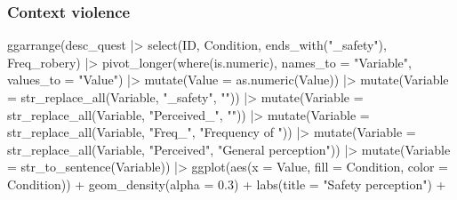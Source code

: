 \documentclass[
  bookmarksnumbered]{article}
\newenvironment{Shaded}{\begin{snugshade}}{\end{snugshade}}
\newcommand{\AttributeTok}[1]{\textcolor[rgb]{0.80,0.80,0.80}{#1}}
\newcommand{\FloatTok}[1]{\textcolor[rgb]{0.75,0.75,0.82}{#1}}
\newcommand{\FunctionTok}[1]{\textcolor[rgb]{0.94,0.94,0.56}{#1}}
\newcommand{\NormalTok}[1]{\textcolor[rgb]{0.80,0.80,0.80}{#1}}
\newcommand{\SpecialCharTok}[1]{\textcolor[rgb]{0.86,0.64,0.64}{#1}}
\newcommand{\StringTok}[1]{\textcolor[rgb]{0.80,0.58,0.58}{#1}}
\begin{document}
\subsubsection{Context violence}\label{context-violence}

\begin{Shaded}
\begin{Highlighting}[]
\FunctionTok{ggarrange}\NormalTok{(desc\_quest }\SpecialCharTok{|\textgreater{}}
            \FunctionTok{select}\NormalTok{(ID, Condition, }\FunctionTok{ends\_with}\NormalTok{(}\StringTok{"\_safety"}\NormalTok{), Freq\_robery) }\SpecialCharTok{|\textgreater{}}
            \FunctionTok{pivot\_longer}\NormalTok{(}\FunctionTok{where}\NormalTok{(is.numeric),}
                         \AttributeTok{names\_to =} \StringTok{"Variable"}\NormalTok{,}
                         \AttributeTok{values\_to =} \StringTok{"Value"}\NormalTok{) }\SpecialCharTok{|\textgreater{}} 
            \FunctionTok{mutate}\NormalTok{(}\AttributeTok{Value =} \FunctionTok{as.numeric}\NormalTok{(Value)) }\SpecialCharTok{|\textgreater{}} 
            \FunctionTok{mutate}\NormalTok{(}\AttributeTok{Variable =} \FunctionTok{str\_replace\_all}\NormalTok{(Variable, }\StringTok{"\_safety"}\NormalTok{, }\StringTok{""}\NormalTok{)) }\SpecialCharTok{|\textgreater{}}
            \FunctionTok{mutate}\NormalTok{(}\AttributeTok{Variable =} \FunctionTok{str\_replace\_all}\NormalTok{(Variable, }\StringTok{"Perceived\_"}\NormalTok{, }\StringTok{""}\NormalTok{)) }\SpecialCharTok{|\textgreater{}}
            \FunctionTok{mutate}\NormalTok{(}\AttributeTok{Variable =} \FunctionTok{str\_replace\_all}\NormalTok{(Variable, }\StringTok{"Freq\_"}\NormalTok{, }\StringTok{"Frequency of "}\NormalTok{)) }\SpecialCharTok{|\textgreater{}}
            \FunctionTok{mutate}\NormalTok{(}\AttributeTok{Variable =} \FunctionTok{str\_replace\_all}\NormalTok{(Variable, }\StringTok{"Perceived"}\NormalTok{, }\StringTok{"General perception"}\NormalTok{)) }\SpecialCharTok{|\textgreater{}}
            \FunctionTok{mutate}\NormalTok{(}\AttributeTok{Variable =} \FunctionTok{str\_to\_sentence}\NormalTok{(Variable)) }\SpecialCharTok{|\textgreater{}} 
            \FunctionTok{ggplot}\NormalTok{(}\FunctionTok{aes}\NormalTok{(}\AttributeTok{x =}\NormalTok{ Value, }\AttributeTok{fill =}\NormalTok{ Condition, }\AttributeTok{color =}\NormalTok{ Condition)) }\SpecialCharTok{+}
            \FunctionTok{geom\_density}\NormalTok{(}\AttributeTok{alpha =} \FloatTok{0.3}\NormalTok{) }\SpecialCharTok{+}
            \FunctionTok{labs}\NormalTok{(}\AttributeTok{title =} \StringTok{"Safety perception"}\NormalTok{) }\SpecialCharTok{+}

\end{Highlighting}
\end{Shaded}
\end{document}

